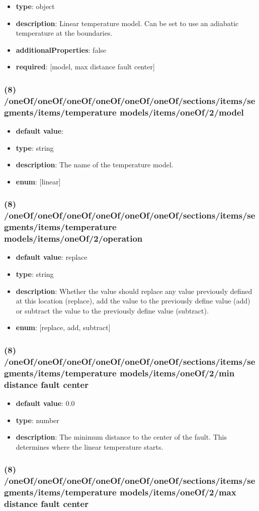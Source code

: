 \begin{itemize}[leftmargin=7em]\item {\bf type}: object
\item {\bf description}: Linear temperature model. Can be set to use an adiabatic temperature at the boundaries.
\item {\bf additionalProperties}: false
\item {\bf required}: [model, max distance fault center]\end{itemize}
\subsubsection{(8) /oneOf/oneOf/oneOf/oneOf/oneOf/oneOf/sections/items/segments/items/temperature models/items/oneOf/2/model}
\begin{itemize}[leftmargin=8em]\item {\bf default value}: 
\item {\bf type}: string
\item {\bf description}: The name of the temperature model.
\item {\bf enum}: [linear]\end{itemize}\subsubsection{(8) /oneOf/oneOf/oneOf/oneOf/oneOf/oneOf/sections/items/segments/items/temperature models/items/oneOf/2/operation}
\begin{itemize}[leftmargin=8em]\item {\bf default value}: replace
\item {\bf type}: string
\item {\bf description}: Whether the value should replace any value previously defined at this location (replace), add the value to the previously define value (add) or subtract the value to the previously define value (subtract).
\item {\bf enum}: [replace, add, subtract]\end{itemize}\subsubsection{(8) /oneOf/oneOf/oneOf/oneOf/oneOf/oneOf/sections/items/segments/items/temperature models/items/oneOf/2/min distance fault center}
\begin{itemize}[leftmargin=8em]\item {\bf default value}: 0.0
\item {\bf type}: number
\item {\bf description}: The minimum distance to the center of the fault. This determines where the linear temperature starts.
\end{itemize}\subsubsection{(8) /oneOf/oneOf/oneOf/oneOf/oneOf/oneOf/sections/items/segments/items/temperature models/items/oneOf/2/max distance fault center}
